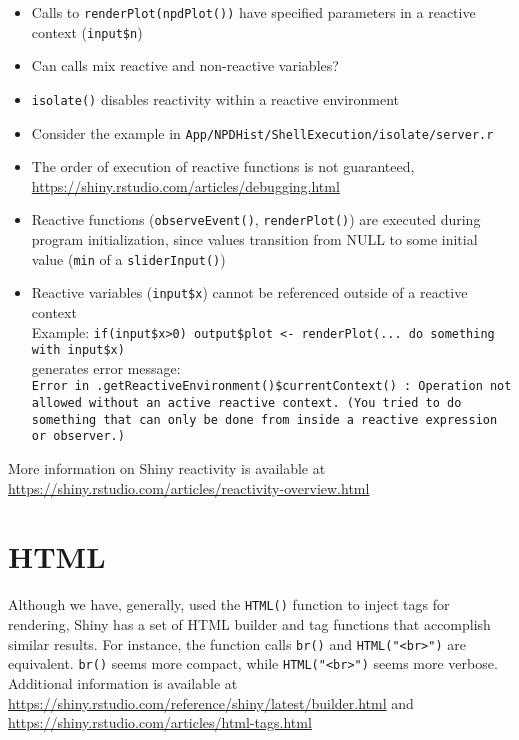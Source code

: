 \documentclass[10pt, letterpaper]{article}
\begin{document}
\begin{spacing}{1.0}
\begin{itemize}
    \item Calls to \texttt{renderPlot(npdPlot())} have specified parameters in a reactive context (\texttt{input\$n})
    \item Can calls mix reactive and non-reactive variables?
    \item \texttt{isolate()} disables reactivity within a reactive environment
    \item Consider the example in \texttt{App/NPDHist/ShellExecution/isolate/server.r}
    \item The order of execution of reactive functions is not guaranteed, \url{https://shiny.rstudio.com/articles/debugging.html}
    \item Reactive functions (\texttt{observeEvent()}, \texttt{renderPlot()}) are executed during program initialization, since values transition from NULL to some initial value (\texttt{min} of a \texttt{sliderInput()})
    \item Reactive variables (\texttt{input\$x}) cannot be referenced outside of a reactive context\\
    Example: \texttt{if(input\$x>0) {output\$plot <- renderPlot(... do something with input\$x)}}\\
    generates error message:\\
    \texttt{Error in .getReactiveEnvironment()\$currentContext() : 
    Operation not allowed without an active reactive context. (You tried to do something that can only be done from inside a reactive expression or observer.)}
\end{itemize}

More information on Shiny reactivity is available at \url{https://shiny.rstudio.com/articles/reactivity-overview.html}


\section{HTML}\label{sec:HTML}

Although we have, generally, used the \texttt{HTML()} function to inject tags for rendering, Shiny has a set of HTML builder and tag functions that accomplish similar results.  For instance, the function calls \texttt{br()} and \texttt{HTML("<br>")} are equivalent.  \texttt{br()} seems more compact, while \texttt{HTML("<br>")} seems more verbose.  Additional information is available at \url{https://shiny.rstudio.com/reference/shiny/latest/builder.html} and \url{https://shiny.rstudio.com/articles/html-tags.html}


\end{spacing}
\end{document}
